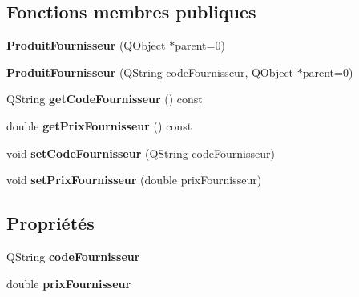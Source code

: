 \subsection*{Fonctions membres publiques}
\begin{DoxyCompactItemize}
\item 
\hypertarget{class_core_1_1_produit_fournisseur_a98254017d4ef0541da1e4f4ea2701b71}{
{\bfseries ProduitFournisseur} (QObject $\ast$parent=0)}
\label{d6/db3/class_core_1_1_produit_fournisseur_a98254017d4ef0541da1e4f4ea2701b71}

\item 
\hypertarget{class_core_1_1_produit_fournisseur_a919a173e34c768151036aa2e48e62faf}{
{\bfseries ProduitFournisseur} (QString codeFournisseur, QObject $\ast$parent=0)}
\label{d6/db3/class_core_1_1_produit_fournisseur_a919a173e34c768151036aa2e48e62faf}

\item 
\hypertarget{class_core_1_1_produit_fournisseur_a100fb8ec0e64617842fdbaed117f8a42}{
QString {\bfseries getCodeFournisseur} () const }
\label{d6/db3/class_core_1_1_produit_fournisseur_a100fb8ec0e64617842fdbaed117f8a42}

\item 
\hypertarget{class_core_1_1_produit_fournisseur_a402bb9863ae2990179b6d135922d298d}{
double {\bfseries getPrixFournisseur} () const }
\label{d6/db3/class_core_1_1_produit_fournisseur_a402bb9863ae2990179b6d135922d298d}

\item 
\hypertarget{class_core_1_1_produit_fournisseur_a2a8047bfecd2ef16e08035ee49b63273}{
void {\bfseries setCodeFournisseur} (QString codeFournisseur)}
\label{d6/db3/class_core_1_1_produit_fournisseur_a2a8047bfecd2ef16e08035ee49b63273}

\item 
\hypertarget{class_core_1_1_produit_fournisseur_ab5b175a302d11050338b3f20624f913d}{
void {\bfseries setPrixFournisseur} (double prixFournisseur)}
\label{d6/db3/class_core_1_1_produit_fournisseur_ab5b175a302d11050338b3f20624f913d}

\end{DoxyCompactItemize}
\subsection*{Propriétés}
\begin{DoxyCompactItemize}
\item 
\hypertarget{class_core_1_1_produit_fournisseur_a7e89d7784e8627f76148c356505f705a}{
QString {\bfseries codeFournisseur}}
\label{d6/db3/class_core_1_1_produit_fournisseur_a7e89d7784e8627f76148c356505f705a}

\item 
\hypertarget{class_core_1_1_produit_fournisseur_a6938005393d9cc2b26475c1ce9f02f93}{
double {\bfseries prixFournisseur}}
\label{d6/db3/class_core_1_1_produit_fournisseur_a6938005393d9cc2b26475c1ce9f02f93}

\end{DoxyCompactItemize}


